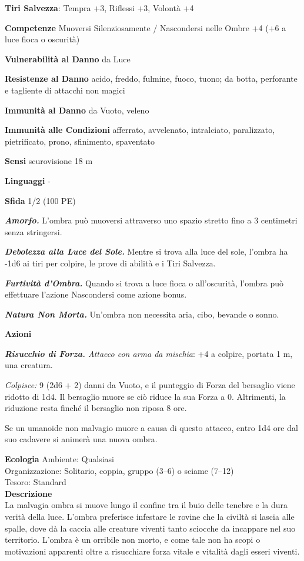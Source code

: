 \begin{multicols}{2}
\textbf{Tiri Salvezza}: Tempra +3, Riflessi +3, Volontà +4

\textbf{Competenze} Muoversi Silenziosamente / Nascondersi nelle Ombre +4 (+6 a luce fioca o oscurità)

\textbf{Vulnerabilità al Danno} da Luce

\textbf{Resistenze al Danno} acido, freddo, fulmine, fuoco, tuono; da botta, perforante e tagliente di attacchi non magici

\textbf{Immunità al Danno} da Vuoto, veleno

\textbf{Immunità alle Condizioni} afferrato, avvelenato, intralciato, paralizzato, pietrificato, prono, sfinimento, spaventato

\textbf{Sensi} scurovisione 18 m

\textbf{Linguaggi} -

\textbf{Sfida} 1/2 (100 PE)

\emph{\textbf{Amorfo.}} L'ombra può muoversi attraverso uno spazio stretto fino a 3 centimetri senza stringersi.

\emph{\textbf{Debolezza alla Luce del Sole.}} Mentre si trova alla luce del sole, l'ombra ha -1d6 ai tiri per colpire, le prove di abilità e i Tiri Salvezza.

\emph{\textbf{Furtività d'Ombra.}} Quando si trova a luce fioca o all'oscurità, l'ombra può effettuare l'azione Nascondersi come azione bonus. 

\emph{\textbf{Natura Non Morta.}} Un'ombra non necessita aria, cibo, bevande o sonno.

\textbf{Azioni}

\emph{\textbf{Risucchio di Forza.} Attacco con arma da mischia}: +4 a colpire, portata 1 m, una creatura.

\emph{Colpisce:} 9 (2d6 + 2) danni da Vuoto, e il punteggio di Forza del bersaglio viene ridotto di 1d4. Il bersaglio muore se ciò riduce la sua Forza a 0. Altrimenti, la riduzione resta finché il bersaglio non riposa 8 ore.

Se un umanoide non malvagio muore a causa di questo attacco, entro 1d4 ore dal suo cadavere si animerà una nuova ombra.

\textbf{Ecologia}
Ambiente: Qualsiasi\\
Organizzazione: Solitario, coppia, gruppo (3–6) o sciame (7–12)\\
Tesoro: Standard\\

\textbf{Descrizione}\\
La malvagia ombra si muove lungo il confine tra il buio delle tenebre e la dura verità della luce. L’ombra preferisce infestare le rovine che la civiltà si lascia alle spalle, dove dà la caccia alle creature viventi tanto sciocche da incappare nel suo territorio. L’ombra è un orribile non morto, e come tale non ha scopi o motivazioni apparenti oltre a risucchiare forza vitale e vitalità dagli esseri viventi.



\end{multicols}
